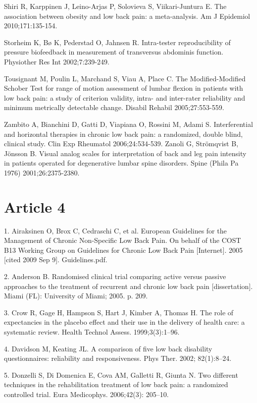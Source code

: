 \documentclass[a5paper]{article}
\theoremstyle{definition}
\begin{document}
Shiri R, Karppinen J, Leino-Arjas P, Solovieva S, Viikari-Juntura E. The
association between obesity and low back pain: a meta-analysis. Am J
Epidemiol 2010;171:135-154.

Storheim K, Bø K, Pederstad O, Jahnsen R. Intra-tester reproducibility of
pressure biofeedback in measurement of transversus abdominis function. Physiother Res Int 2002;7:239-249.

Tousignant M, Poulin L, Marchand S, Viau A, Place C. The Modified-Modified Schober Test for range of motion assessment of lumbar
flexion in patients with low back pain: a study of criterion validity, intra- and inter-rater reliability and minimum metrically detectable
change. Disabil Rehabil 2005;27:553-559.

Zambito A, Bianchini D, Gatti D, Viapiana O, Rossini M, Adami S. Interferential and horizontal therapies in chronic low back pain: a randomized, double blind, clinical study. Clin Exp Rheumatol 2006;24:534-539.
Zanoli G, Strömqvist B, Jönsson B. Visual analog scales for interpretation
of back and leg pain intensity in patients operated for degenerative
lumbar spine disorders. Spine (Phila Pa 1976) 2001;26:2375-2380.
\section{Article 4}
1. Airaksinen O, Brox C, Cedraschi C, et al. European Guidelines for
the Management of Chronic Non-Specific Low Back Pain. On
behalf of the COST B13 Working Group on Guidelines for
Chronic Low Back Pain [Internet]. 2005 [cited 2009 Sep 9].
Guidelines.pdf.

2. Anderson B. Randomised clinical trial comparing active versus
passive approaches to the treatment of recurrent and chronic low
back pain [dissertation]. Miami (FL): University of Miami; 2005.
p. 209.

3. Crow R, Gage H, Hampson S, Hart J, Kimber A, Thomas H. The
role of expectancies in the placebo effect and their use in the delivery of health care: a systematic review. Health Technol Assess.
1999;3(3):1–96.

4. Davidson M, Keating JL. A comparison of five low back disability
questionnaires: reliability and responsiveness. Phys Ther. 2002;
82(1):8–24.

5. Donzelli S, Di Domenica E, Cova AM, Galletti R, Giunta N. Two
different techniques in the rehabilitation treatment of low back
pain: a randomized controlled trial. Eura Medicophys. 2006;42(3):
205–10.
\end{document}
